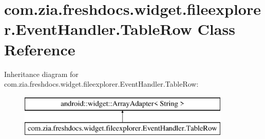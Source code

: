 \hypertarget{classcom_1_1zia_1_1freshdocs_1_1widget_1_1fileexplorer_1_1_event_handler_1_1_table_row}{\section{com.\-zia.\-freshdocs.\-widget.\-fileexplorer.\-Event\-Handler.\-Table\-Row Class Reference}
\label{classcom_1_1zia_1_1freshdocs_1_1widget_1_1fileexplorer_1_1_event_handler_1_1_table_row}
}
Inheritance diagram for com.\-zia.\-freshdocs.\-widget.\-fileexplorer.\-Event\-Handler.\-Table\-Row\-:\begin{figure}[H]
\begin{center}
\leavevmode
\includegraphics[height=2.000000cm]{classcom_1_1zia_1_1freshdocs_1_1widget_1_1fileexplorer_1_1_event_handler_1_1_table_row}
\end{center}
\end{figure}
